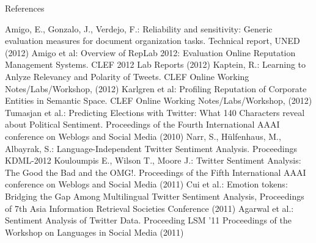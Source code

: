 \documentclass[12pt,a4paper]{beamer}
\begin{document}
\begin{frame}{References}
\begin{thebibliography}{-}
 Amigo, E., Gonzalo, J., Verdejo, F.: Reliability and sensitivity: Generic evaluation measures for document organization tasks. Technical report, UNED (2012)
 Amigo et al: Overview of RepLab 2012: Evaluation Online Reputation Management Systems. CLEF 2012 Lab Reports (2012)
 Kaptein, R.: Learning to Anlyze Relevancy and Polarity of Tweets. CLEF Online Working Notes/Labs/Workshop, (2012)
 Karlgren et al: Profiling Reputation of Corporate Entities in Semantic Space. CLEF Online Working Notes/Labs/Workshop, (2012)
 Tumasjan et al.: Predicting Elections with Twitter: What 140 Characters reveal about Political Sentiment. Proceedings of the Fourth International AAAI conference on Weblogs and Social Media (2010)
 Narr, S., Hülfenhaus, M., Albayrak, S.: Language-Independent Twitter Sentiment Analysis. Proceedings KDML-2012
 Kouloumpis E., Wilson T., Moore J.: Twitter Sentiment Analysis: The Good the Bad and the OMG!.  Proceedings of the Fifth International AAAI conference on Weblogs and Social Media (2011)
 Cui et al.: Emotion tokens: Bridging the Gap Among Multilingual Twitter Sentiment Analysis, Proceedings of 7th Asia Information Retrieval Societies Conference (2011)
 Agarwal et al.: Sentiment Analysis of Twitter Data. Proceeding LSM '11 Proceedings of the Workshop on Languages in Social Media (2011)
\end{thebibliography}
\end{frame}
\end{document}
